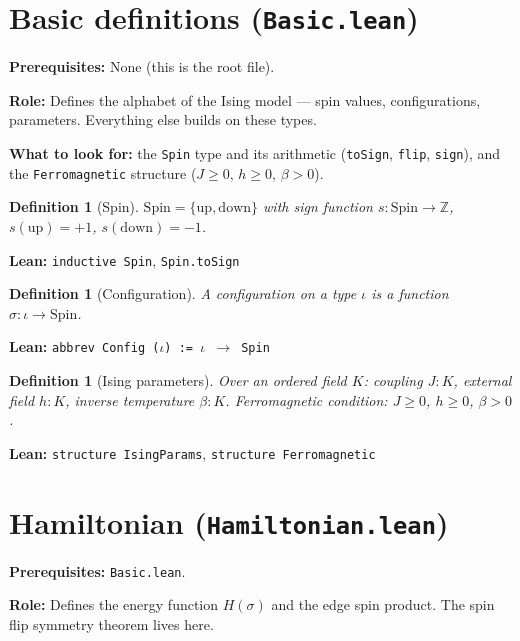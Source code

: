 \documentclass[a4paper,11pt]{article}
\newtheorem{definition}[theorem]{Definition}
\begin{document}
\section{Basic definitions (\texttt{Basic.lean})}

\par\noindent\textbf{Prerequisites:} None (this is the root file).

\textbf{Role:} Defines the alphabet of the Ising model --- spin values,
configurations, parameters. Everything else builds on these types.

\textbf{What to look for:} the \texttt{Spin} type and its arithmetic
(\texttt{toSign}, \texttt{flip}, \texttt{sign}), and the
\texttt{Ferromagnetic} structure ($J \ge 0$, $h \ge 0$, $\beta > 0$).

\begin{definition}[Spin]
$\mathrm{Spin} = \{\mathrm{up}, \mathrm{down}\}$ with sign function
$s : \mathrm{Spin} \to \mathbb{Z}$, $s(\mathrm{up})=+1$,
$s(\mathrm{down})=-1$.
\end{definition}

\noindent\textbf{Lean:} \texttt{inductive Spin}, \texttt{Spin.toSign}

\begin{definition}[Configuration]
A configuration on a type $\iota$ is a function
$\sigma : \iota \to \mathrm{Spin}$.
\end{definition}

\noindent\textbf{Lean:} \texttt{abbrev Config ($\iota$) := $\iota$ $\to$ Spin}

\begin{definition}[Ising parameters]
Over an ordered field $K$: coupling $J : K$, external field $h : K$,
inverse temperature $\beta : K$.
Ferromagnetic condition: $J \geq 0$, $h \geq 0$, $\beta > 0$.
\end{definition}

\noindent\textbf{Lean:} \texttt{structure IsingParams},
\texttt{structure Ferromagnetic}

\section{Hamiltonian (\texttt{Hamiltonian.lean})}

\par\noindent\textbf{Prerequisites:} \texttt{Basic.lean}.

\textbf{Role:} Defines the energy function $H(\sigma)$ and
the edge spin product. The spin flip symmetry theorem lives here.
\end{document}
